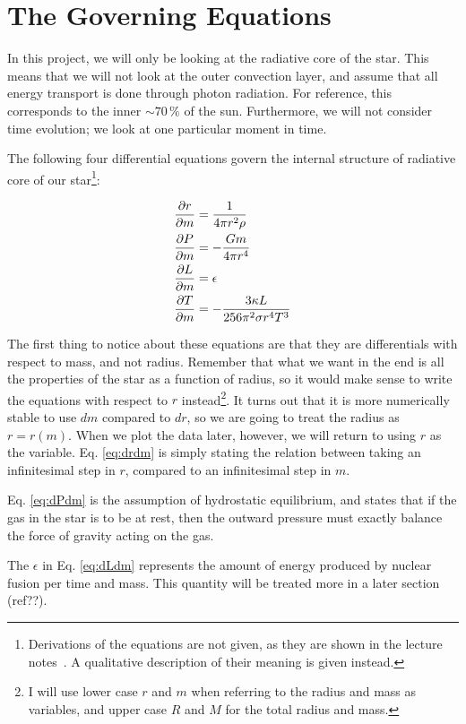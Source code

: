 \documentclass[11pt,twocolumn]{article}
\begin{document}
\section{The Governing Equations}
In this project, we will only be looking at the radiative core of the
star. This means that we will not look at the outer convection layer,
and assume that all energy transport is done through photon
radiation. For reference, this corresponds to the inner $\sim 70\,\%$ of the
sun. Furthermore, we will not consider time evolution; we look at one
particular moment in time. 

The following four differential equations govern the internal
structure of radiative core of our star\footnote{Derivations of the
  equations are not given, as they are shown in the lecture
  notes~\cite{lecture-notes}. A qualitative description of their
  meaning is given instead.}:

\begin{align}
  \frac{\partial r}{\partial m} &= \frac{ 1 }{ 4\pi r^2\rho }\label{eq:drdm}\\
  \frac{\partial P}{\partial m} &= - \frac{ Gm }{ 4\pi r^4 }\label{eq:dPdm}\\
  \frac{\partial L}{\partial m} &= \epsilon\label{eq:dLdm}\\
  \frac{\partial T}{\partial m} &= - \frac{ 3\kappa L }{ 256 \pi^2 \sigma r^4T^3 }\label{eq:dTdm}
\end{align}

The first thing to notice about these equations are that they are
differentials with respect to mass, and not radius. Remember that what
we want in the end is all the properties of the star as a function of
radius, so it would make sense to write the equations with respect to
$r$ instead\footnote{I will use lower case $r$ and $m$ when referring
  to the radius and mass as variables, and upper case $R$ and $M$ for
  the total radius and mass.}. It turns out that it is more numerically
stable to use $dm$ compared to $dr$, so we are going to treat the
radius as $r=r(m)$. When we plot the data later, however, we will
return to using $r$ as the variable. Eq. \eqref{eq:drdm} is simply
stating the relation between taking an infinitesimal step in $r$,
compared to an infinitesimal step in $m$. 

Eq. \eqref{eq:dPdm} is the assumption of hydrostatic equilibrium, and
states that if the gas in the star is to be at rest, then the outward
pressure must exactly balance the force of gravity acting on the gas. 

The $\epsilon$ in Eq. \eqref{eq:dLdm} represents the amount of
energy produced by nuclear fusion per time and mass. This quantity
will be treated more in a later section (ref??).
\end{document}
